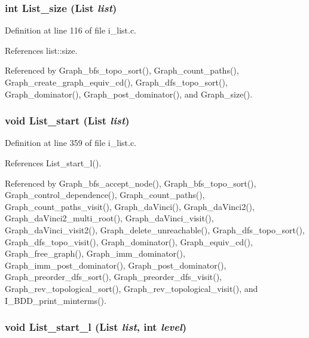 \subsubsection{\setlength{\rightskip}{0pt plus 5cm}int List\_\-size (\bf{List} {\em list})}\label{i__list_8h_1fc62b2ee8fef0e5b90fb891a804afe5}




Definition at line 116 of file i\_\-list.c.

References list::size.

Referenced by Graph\_\-bfs\_\-topo\_\-sort(), Graph\_\-count\_\-paths(), Graph\_\-create\_\-graph\_\-equiv\_\-cd(), Graph\_\-dfs\_\-topo\_\-sort(), Graph\_\-dominator(), Graph\_\-post\_\-dominator(), and Graph\_\-size().
\subsubsection{\setlength{\rightskip}{0pt plus 5cm}void List\_\-start (\bf{List} {\em list})}\label{i__list_8h_ae4cc14a4e764e7841627ade10f15766}




Definition at line 359 of file i\_\-list.c.

References List\_\-start\_\-l().

Referenced by Graph\_\-bfs\_\-accept\_\-node(), Graph\_\-bfs\_\-topo\_\-sort(), Graph\_\-control\_\-dependence(), Graph\_\-count\_\-paths(), Graph\_\-count\_\-paths\_\-visit(), Graph\_\-da\-Vinci(), Graph\_\-da\-Vinci2(), Graph\_\-da\-Vinci2\_\-multi\_\-root(), Graph\_\-da\-Vinci\_\-visit(), Graph\_\-da\-Vinci\_\-visit2(), Graph\_\-delete\_\-unreachable(), Graph\_\-dfs\_\-topo\_\-sort(), Graph\_\-dfs\_\-topo\_\-visit(), Graph\_\-dominator(), Graph\_\-equiv\_\-cd(), Graph\_\-free\_\-graph(), Graph\_\-imm\_\-dominator(), Graph\_\-imm\_\-post\_\-dominator(), Graph\_\-post\_\-dominator(), Graph\_\-preorder\_\-dfs\_\-sort(), Graph\_\-preorder\_\-dfs\_\-visit(), Graph\_\-rev\_\-topological\_\-sort(), Graph\_\-rev\_\-topological\_\-visit(), and I\_\-BDD\_\-print\_\-minterms().
\subsubsection{\setlength{\rightskip}{0pt plus 5cm}void List\_\-start\_\-l (\bf{List} {\em list}, int {\em level})}\label{i__list_8h_7bd3655aa75a18064dbd0e975b4c05c3}





